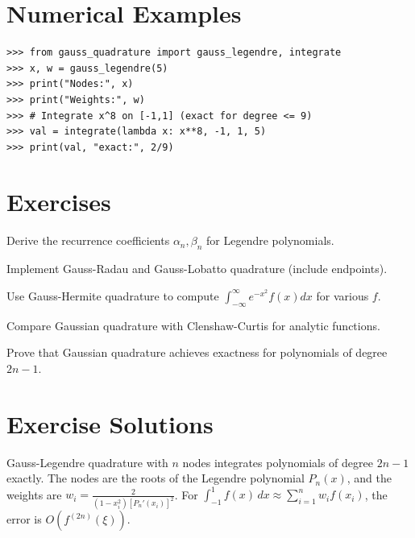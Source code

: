 \section{Numerical Examples}

\begin{example}
\begin{lstlisting}[style=python]
>>> from gauss_quadrature import gauss_legendre, integrate
>>> x, w = gauss_legendre(5)
>>> print("Nodes:", x)
>>> print("Weights:", w)
>>> # Integrate x^8 on [-1,1] (exact for degree <= 9)
>>> val = integrate(lambda x: x**8, -1, 1, 5)
>>> print(val, "exact:", 2/9)
\end{lstlisting}
\end{example}

\section{Exercises}

\begin{exercise}
Derive the recurrence coefficients $\alpha_n, \beta_n$ for Legendre polynomials.
\end{exercise}

\begin{exercise}
Implement Gauss-Radau and Gauss-Lobatto quadrature (include endpoints).
\end{exercise}

\begin{exercise}
Use Gauss-Hermite quadrature to compute $\int_{-\infty}^{\infty} e^{-x^2} f(x) dx$ for various $f$.
\end{exercise}

\begin{exercise}
Compare Gaussian quadrature with Clenshaw-Curtis for analytic functions.
\end{exercise}

\begin{exercise}
Prove that Gaussian quadrature achieves exactness for polynomials of degree $2n-1$.
\end{exercise}



\section{Exercise Solutions}

\begin{solution}
Gauss-Legendre quadrature with $n$ nodes integrates polynomials of degree $2n-1$ exactly. The nodes are the roots of the Legendre polynomial $P_n(x)$, and the weights are $w_i = \frac{2}{(1-x_i^2)[P_n'(x_i)]^2}$. For $\int_{-1}^{1} f(x)\,dx \approx \sum_{i=1}^n w_i f(x_i)$, the error is $O(f^{(2n)}(\xi))$.
\end{solution}

